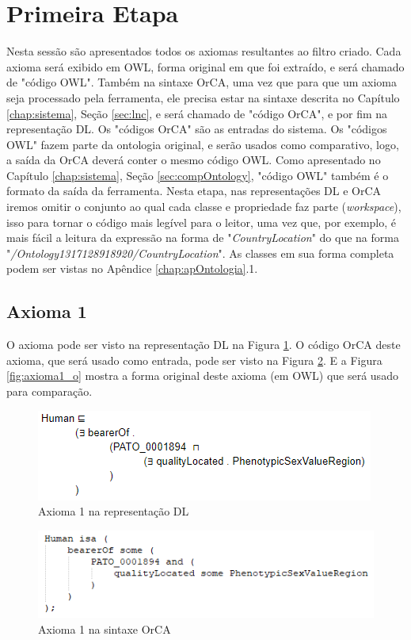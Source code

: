 \documentclass{bcc}
\begin{document}
\section{Primeira Etapa}

Nesta sessão são apresentados todos os axiomas resultantes ao filtro criado. Cada axioma será exibido em OWL, forma original em que foi extraído, e será chamado de "código OWL". Também na sintaxe OrCA, uma vez que para que um axioma seja processado pela ferramenta, ele precisa estar na sintaxe descrita no Capítulo \ref{chap:sistema}, Seção \ref{sec:lnc}, e será chamado de "código OrCA", e por fim na representação DL. Os "códigos OrCA" são as entradas do sistema. Os "códigos OWL" fazem parte da ontologia original, e serão usados como comparativo, logo, a saída da OrCA deverá conter o mesmo código OWL. Como apresentado no Capítulo \ref{chap:sistema}, Seção \ref{sec:compOntology}, "código OWL" também é o formato da saída da ferramenta. Nesta etapa, nas representações DL e OrCA iremos omitir o conjunto ao qual cada classe e propriedade faz parte (\textit{workspace}), isso para tornar o código mais legível para o leitor, uma vez que, por exemplo, é mais fácil a leitura da expressão na forma de "\textit{CountryLocation}" do que na forma  "\textit{/Ontology1317128918920/CountryLocation}". As classes em sua forma completa podem ser vistas no Apêndice \ref{chap:apOntologia}.1.

\subsection{Axioma 1}
O axioma pode ser visto na representação DL na Figura \ref{fig:axioma1_dl}. O código OrCA deste axioma, que será usado como entrada, pode ser visto na Figura \ref{fig:axioma1_orca}. E a Figura \ref{fig:axioma1_o} mostra a forma original deste axioma (em OWL) que será usado para comparação. 

\begin{figure}[H]
\centering
\includegraphics[width=.7\textwidth]{Figuras/axioma1_dl.png}
\caption{Axioma 1 na representação DL} 
\label{fig:axioma1_dl}
\end{figure}

\begin{figure}[H]
\centering
\includegraphics[width=.7\textwidth]{Figuras/axioma1_orca.png}
\caption{Axioma 1 na sintaxe OrCA} 
\label{fig:axioma1_orca}
\end{figure}
\end{document}
